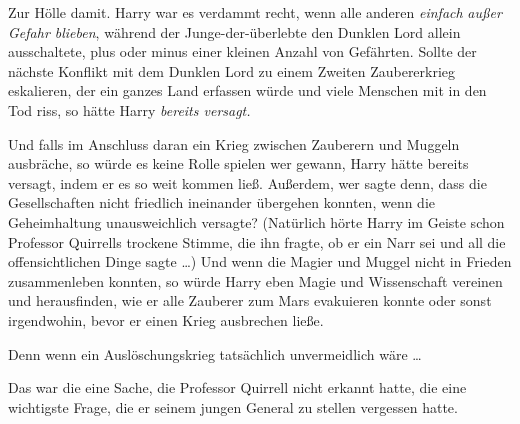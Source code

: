 Zur Hölle damit. Harry war es verdammt recht, wenn alle anderen \emph{einfach} \emph{außer Gefahr blieben}, während der Junge-der-überlebte den Dunklen Lord allein ausschaltete, plus oder minus einer kleinen Anzahl von Gefährten. Sollte der nächste Konflikt mit dem Dunklen Lord zu einem Zweiten Zaubererkrieg eskalieren, der ein ganzes Land erfassen würde und viele Menschen mit in den Tod riss, so hätte Harry \emph{bereits versagt.}

Und falls im Anschluss daran ein Krieg zwischen Zauberern und Muggeln ausbräche, so würde es keine Rolle spielen wer gewann, Harry hätte bereits versagt, indem er es so weit kommen ließ. Außerdem, wer sagte denn, dass die Gesellschaften nicht friedlich ineinander übergehen konnten, wenn die Geheimhaltung unausweichlich versagte? (Natürlich hörte Harry im Geiste schon Professor Quirrells trockene Stimme, die ihn fragte, ob er ein Narr sei und all die offensichtlichen Dinge sagte …) Und wenn die Magier und Muggel nicht in Frieden zusammenleben konnten, so würde Harry eben Magie und Wissenschaft vereinen und herausfinden, wie er alle Zauberer zum Mars evakuieren konnte oder sonst irgendwohin, bevor er einen Krieg ausbrechen ließe.%

Denn wenn ein Auslöschungskrieg tatsächlich unvermeidlich wäre …

Das war die eine Sache, die Professor Quirrell nicht erkannt hatte, die eine wichtigste Frage, die er seinem jungen General zu stellen vergessen hatte.

